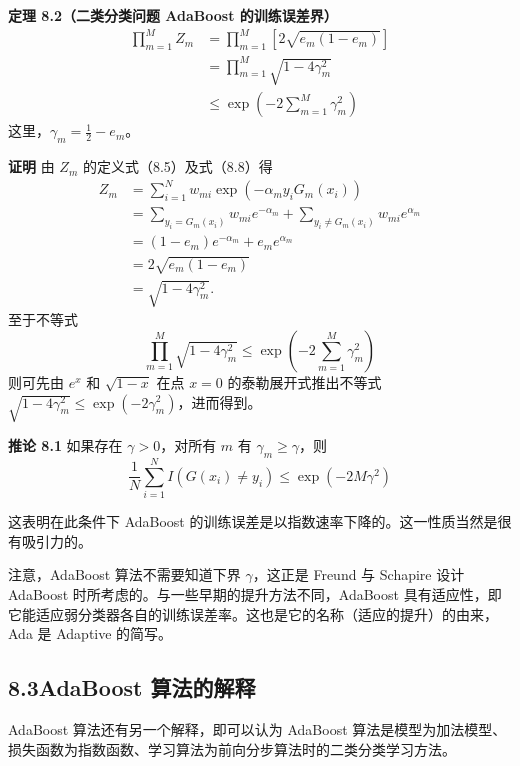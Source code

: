 \documentclass[UTF8, 12pt, fontset=fandol, oneside]{ctexart}
\begin{document}
\noindent\textbf{定理 8.2（二类分类问题 AdaBoost 的训练误差界）}\quad
\begin{equation}
\begin{aligned}
\prod_{m=1}^M Z_m
&=\prod_{m=1}^M \left[2\sqrt{e_m(1-e_m)}\right]\\
&=\prod_{m=1}^M \sqrt{1-4\gamma_m^2}\\
&\leq \exp\left(-2\sum_{m=1}^M \gamma_m^2\right)
\end{aligned}
\tag{8.10}
\end{equation}
这里，$\gamma_m=\frac{1}{2}-e_m$。

\noindent\textbf{证明}\quad
由 $Z_m$ 的定义式（8.5）及式（8.8）得
\[
\begin{aligned}
Z_m
&=\sum_{i=1}^N w_{mi}\exp(-\alpha_my_iG_m(x_i))\\
&=\sum_{y_i=G_m(x_i)}w_{mi}e^{-\alpha_m}
+\sum_{y_i\ne G_m(x_i)}w_{mi}e^{\alpha_m}\\
&=(1-e_m)e^{-\alpha_m}+e_me^{\alpha_m}\\
&=2\sqrt{e_m(1-e_m)}\\
&=\sqrt{1-4\gamma_m^2}.
\end{aligned}
\tag{8.11}
\]
至于不等式
\[
\prod_{m=1}^M \sqrt{1-4\gamma_m^2}
\leq \exp\left(-2\sum_{m=1}^M \gamma_m^2\right)
\]
则可先由 $e^x$ 和 $\sqrt{1-x}$ 在点 $x=0$ 的泰勒展开式推出不等式 $\sqrt{1-4\gamma_m^2}\leq \exp(-2\gamma_m^2)$，进而得到。

\noindent\textbf{推论 8.1}\quad
如果存在 $\gamma>0$，对所有 $m$ 有 $\gamma_m\geq \gamma$，则
\begin{equation}
\frac{1}{N}\sum_{i=1}^N I(G(x_i)\ne y_i)\leq \exp(-2M\gamma^2)
\tag{8.12}
\end{equation}

这表明在此条件下 AdaBoost 的训练误差是以指数速率下降的。这一性质当然是很有吸引力的。

注意，AdaBoost 算法不需要知道下界 $\gamma$，这正是 Freund 与 Schapire 设计 AdaBoost 时所考虑的。与一些早期的提升方法不同，AdaBoost 具有适应性，即它能适应弱分类器各自的训练误差率。这也是它的名称（适应的提升）的由来，Ada 是 Adaptive 的简写。

\subsection*{8.3\quad AdaBoost 算法的解释}

AdaBoost 算法还有另一个解释，即可以认为 AdaBoost 算法是模型为加法模型、损失函数为指数函数、学习算法为前向分步算法时的二类分类学习方法。
\end{document}
